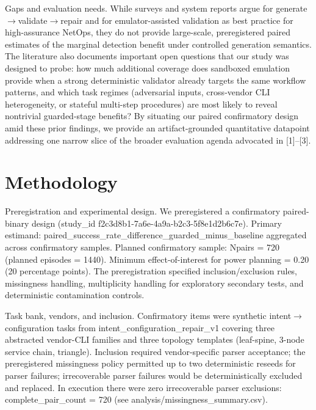 \documentclass[conference]{IEEEtran}
\begin{document}
Gaps and evaluation needs. While surveys and system reports argue for generate\ensuremath{\rightarrow}validate\ensuremath{\rightarrow}repair and for emulator-assisted validation as best practice for high-assurance NetOps, they do not provide large-scale, preregistered paired estimates of the marginal detection benefit under controlled generation semantics. The literature also documents important open questions that our study was designed to probe: how much additional coverage does sandboxed emulation provide when a strong deterministic validator already targets the same workflow patterns, and which task regimes (adversarial inputs, cross‑vendor CLI heterogeneity, or stateful multi-step procedures) are most likely to reveal nontrivial guarded-stage benefits? By situating our paired confirmatory design amid these prior findings, we provide an artifact-grounded quantitative datapoint addressing one narrow slice of the broader evaluation agenda advocated in [1]--[3].

\section{Methodology}
Preregistration and experimental design. We preregistered a confirmatory paired-binary design (study\_id f2c3d8b1-7a6e-4a9a-b2c3-5f8e1d2b6c7e). Primary estimand: paired\_success\_rate\_difference\_guarded\_minus\_baseline aggregated across confirmatory samples. Planned confirmatory sample: Npairs = 720 (planned episodes = 1440). Minimum effect-of-interest for power planning = 0.20 (20 percentage points). The preregistration specified inclusion/exclusion rules, missingness handling, multiplicity handling for exploratory secondary tests, and deterministic contamination controls.

Task bank, vendors, and inclusion. Confirmatory items were synthetic intent\ensuremath{\rightarrow}configuration tasks from intent\_configuration\_repair\_v1 covering three abstracted vendor-CLI families and three topology templates (leaf-spine, 3-node service chain, triangle). Inclusion required vendor-specific parser acceptance; the preregistered missingness policy permitted up to two deterministic reseeds for parser failures; irrecoverable parser failures would be deterministically excluded and replaced. In execution there were zero irrecoverable parser exclusions: complete\_pair\_count = 720 (see analysis/missingness\_summary.csv).
\end{document}

